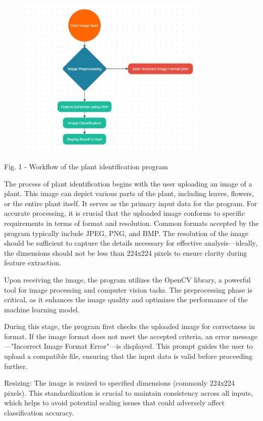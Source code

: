 {{\begin{figure}[H]
	\centering
	\includegraphics[width=0.8\textwidth]{media/ict/image31}
	\caption*{}
\end{figure}


Fig. 1 - Workflow of the plant identification program

The process of plant identification begins with the user uploading an
image of a plant. This image can depict various parts of the plant,
including leaves, flowers, or the entire plant itself. It serves as the
primary input data for the program. For accurate processing, it is
crucial that the uploaded image conforms to specific requirements in
terms of format and resolution. Common formats accepted by the program
typically include JPEG, PNG, and BMP. The resolution of the image should
be sufficient to capture the details necessary for effective
analysis---ideally, the dimensions should not be less than 224x224
pixels to ensure clarity during feature extraction.

Upon receiving the image, the program utilizes the OpenCV library, a
powerful tool for image processing and computer vision tasks. The
preprocessing phase is critical, as it enhances the image quality and
optimizes the performance of the machine learning model.

During this stage, the program first checks the uploaded image for
correctness in format. If the image format does not meet the accepted
criteria, an error message---"Incorrect Image Format Error"---is
displayed. This prompt guides the user to upload a compatible file,
ensuring that the input data is valid before proceeding further.

Resizing: The image is resized to specified dimensions (commonly 224x224
pixels). This standardization is crucial to maintain consistency across
all inputs, which helps to avoid potential scaling issues that could
adversely affect classification accuracy.

}}
